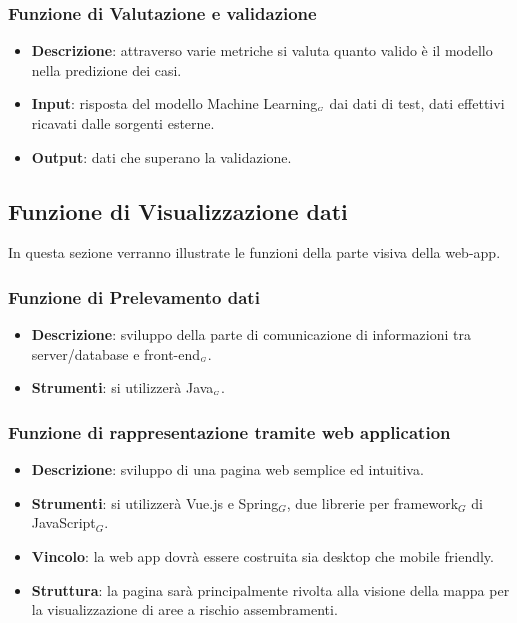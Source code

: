 \subsubsection{Funzione di Valutazione e validazione}\label{}

\begin{itemize}
	\item \textbf{Descrizione}: attraverso varie metriche si valuta quanto valido è il modello nella predizione dei casi.
	\item \textbf{Input}: risposta del modello Machine Learning$_{\scaleto{G}{3pt}}$ dai dati di test, dati effettivi ricavati dalle sorgenti esterne.
	\item \textbf{Output}: dati che superano la validazione.
\end{itemize}

\subsection{Funzione di Visualizzazione dati}\label{}
In questa sezione verranno illustrate le funzioni della parte visiva della web-app.

\subsubsection{Funzione di Prelevamento dati}\label{}

\begin{itemize}
	\item \textbf{Descrizione}: sviluppo della parte di comunicazione di informazioni tra server/database e front-end$_{\scaleto{G}{3pt}}$.
	\item \textbf{Strumenti}: si utilizzerà Java$_{\scaleto{G}{3pt}}$.
\end{itemize}

\subsubsection{Funzione di rappresentazione tramite web application}\label{}

\begin{itemize}
	\item \textbf{Descrizione}: sviluppo di una pagina web semplice ed intuitiva.
	\item \textbf{Strumenti}: si utilizzerà Vue.js e Spring$_G$, due librerie per framework$_G$ di JavaScript$_G$.
	\item \textbf{Vincolo}: la web app dovrà essere costruita sia desktop che mobile friendly.
	\item \textbf{Struttura}: la pagina sarà principalmente rivolta alla visione della mappa per la visualizzazione di aree a rischio assembramenti.
\end{itemize}


